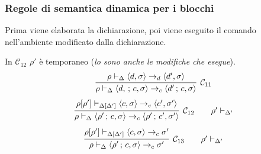\documentclass[oneside,a4paper,11pt]{book}
\theoremstyle{italicstyle}
\theoremstyle{normStyle}
\begin{document}
\subsubsection{Regole di semantica dinamica per i blocchi}
Prima viene elaborata la dichiarazione, poi viene eseguito il comando nell'ambiente 
modificato dalla dichiarazione.

In $\mathcal{C}_{12}$ $\rho'$ è temporaneo (\textit{lo sono anche le modifiche 
che esegue}).
\[
  \infer[\mathcal{C}_{11}]
  {
    \rho \vdash_\Delta \langle d,\,;\,c, \sigma\rangle \rightarrow_c \langle d'\,;\,c ,\sigma\rangle
  }
  {
    \rho \vdash_\Delta \langle d, \sigma\rangle \rightarrow_d \langle d' ,\sigma\rangle
  }
\]
\[
  \infer[\mathcal{C}_{12}\qquad\rho'\vdash_{\Delta'}]
  {
    \rho \vdash_\Delta \langle \rho'\,;\,c, \sigma\rangle \rightarrow_c \langle \rho'\,;\,c' ,\sigma'\rangle
  }
  {
    \rho[\rho'] \vdash_{\Delta[\Delta']} \langle c, \sigma\rangle \rightarrow_c \langle c' ,\sigma'\rangle
  }
\]
\[
  \infer[\mathcal{C}_{13}\qquad\rho'\vdash_{\Delta'}]
  {
    \rho \vdash_\Delta \langle \rho'\,;\,c, \sigma\rangle \rightarrow_c \sigma'
  }
  {
    \rho[\rho'] \vdash_{\Delta[\Delta']} \langle c, \sigma\rangle \rightarrow_c \sigma'
  }
\]
\end{document}

